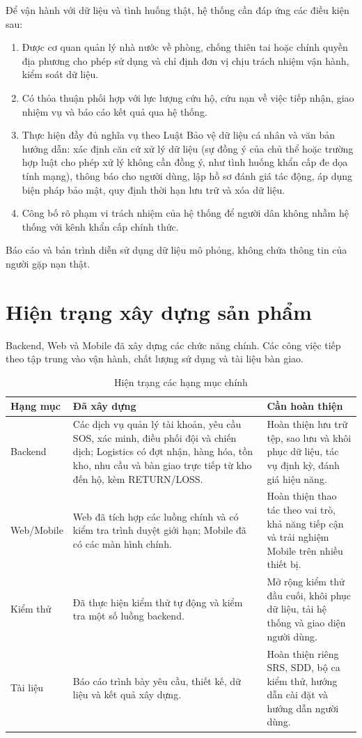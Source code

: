 \documentclass[12pt,a4paper,oneside]{report}
\begin{document}
Để vận hành với dữ liệu và tình huống thật, hệ thống cần đáp ứng các điều kiện sau:
\begin{enumerate}
  \item Được cơ quan quản lý nhà nước về phòng, chống thiên tai hoặc chính quyền địa phương cho phép sử dụng và chỉ định đơn vị chịu trách nhiệm vận hành, kiểm soát dữ liệu.
  \item Có thỏa thuận phối hợp với lực lượng cứu hộ, cứu nạn về việc tiếp nhận, giao nhiệm vụ và báo cáo kết quả qua hệ thống.
  \item Thực hiện đầy đủ nghĩa vụ theo Luật Bảo vệ dữ liệu cá nhân và văn bản hướng dẫn: xác định căn cứ xử lý dữ liệu (sự đồng ý của chủ thể hoặc trường hợp luật cho phép xử lý không cần đồng ý, như tình huống khẩn cấp đe dọa tính mạng), thông báo cho người dùng, lập hồ sơ đánh giá tác động, áp dụng biện pháp bảo mật, quy định thời hạn lưu trữ và xóa dữ liệu.
  \item Công bố rõ phạm vi trách nhiệm của hệ thống để người dân không nhầm hệ thống với kênh khẩn cấp chính thức.
\end{enumerate}
Báo cáo và bản trình diễn sử dụng dữ liệu mô phỏng, không chứa thông tin của người gặp nạn thật.

\clearpage
\section{Hiện trạng xây dựng sản phẩm}
Backend, Web và Mobile đã xây dựng các chức năng chính. Các công việc tiếp theo tập trung vào vận hành, chất lượng sử dụng và tài liệu bàn giao.
\begin{table}[H]
  \centering
  \caption{Hiện trạng các hạng mục chính}\label{tab:project-status}
  \small
  \begin{tabularx}{\textwidth}{|L{2.5cm}|Y|Y|}
    \hline
    \centering\textbf{Hạng mục} & \centering\textbf{Đã xây dựng} & \centering\arraybackslash\textbf{Cần hoàn thiện} \\
    \hline
    Backend & Các dịch vụ quản lý tài khoản, yêu cầu SOS, xác minh, điều phối đội và chiến dịch; Logistics có đợt nhận, hàng hóa, tồn kho, nhu cầu và bàn giao trực tiếp từ kho đến hộ, kèm RETURN/LOSS. & Hoàn thiện lưu trữ tệp, sao lưu và khôi phục dữ liệu, tác vụ định kỳ, đánh giá hiệu năng. \\
    \hline
    Web/Mobile & Web đã tích hợp các luồng chính và có kiểm tra trình duyệt giới hạn; Mobile đã có các màn hình chính. & Hoàn thiện thao tác theo vai trò, khả năng tiếp cận và trải nghiệm Mobile trên nhiều thiết bị. \\
    \hline
    Kiểm thử & Đã thực hiện kiểm thử tự động và kiểm tra một số luồng backend. & Mở rộng kiểm thử đầu cuối, khôi phục dữ liệu, tải hệ thống và giao diện người dùng. \\
    \hline
    Tài liệu & Báo cáo trình bày yêu cầu, thiết kế, dữ liệu và kết quả xây dựng. & Hoàn thiện riêng SRS, SDD, bộ ca kiểm thử, hướng dẫn cài đặt và hướng dẫn người dùng. \\
    \hline
  \end{tabularx}
\end{table}
\end{document}
